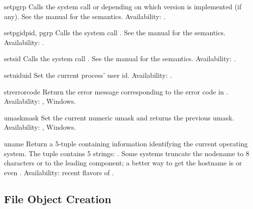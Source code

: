 \begin{funcdesc}{setpgrp}{}
Calls the system call  or  depending on which version is implemented (if any).  See the
\UNIX{} manual for the semantics.
Availability: \UNIX{}.
\end{funcdesc}

\begin{funcdesc}{setpgid}{pid, pgrp}
Calls the system call .  See the \UNIX{} manual
for the semantics.
Availability: \UNIX{}.
\end{funcdesc}

\begin{funcdesc}{setsid}{}
Calls the system call .  See the \UNIX{} manual
for the semantics.
Availability: \UNIX{}.
\end{funcdesc}

\begin{funcdesc}{setuid}{uid}
Set the current process' user id.
Availability: \UNIX{}.
\end{funcdesc}

\begin{funcdesc}{strerror}{code}
Return the error message corresponding to the error code in
.
Availability: \UNIX{}, Windows.
\end{funcdesc}

\begin{funcdesc}{umask}{mask}
Set the current numeric umask and returns the previous umask.
Availability: \UNIX{}, Windows.
\end{funcdesc}

\begin{funcdesc}{uname}{}
Return a 5-tuple containing information identifying the current
operating system.  The tuple contains 5 strings:
.  Some systems truncate the nodename to 8
characters or to the leading component; a better way to get the
hostname is 
or even
.
Availability: recent flavors of \UNIX{}.
\end{funcdesc}



\subsection{File Object Creation \label{os-newstreams}}

